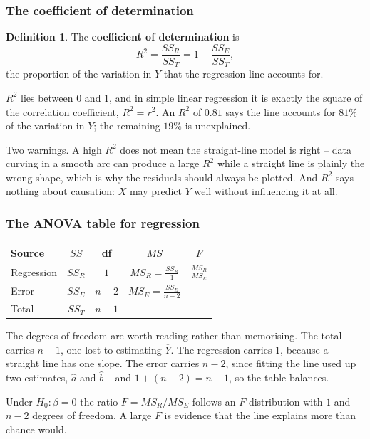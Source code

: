 \documentclass[11pt,a4paper]{article}
\theoremstyle{definition}
\newtheorem{definition}[thm]{Definition}
\begin{document}
\subsubsection{The coefficient of determination}

\begin{definition}
The \textbf{coefficient of determination} is
\[R^2=\frac{SS_R}{SS_T}=1-\frac{SS_E}{SS_T},\]
the proportion of the variation in $Y$ that the regression line accounts for.
\end{definition}

$R^2$ lies between 0 and 1, and in simple linear regression it is exactly the square of the
correlation coefficient, $R^2=r^2$. An $R^2$ of $0.81$ says the line accounts for $81\%$ of
the variation in $Y$; the remaining $19\%$ is unexplained.

Two warnings. A high $R^2$ does not mean the straight-line model is right -- data curving
in a smooth arc can produce a large $R^2$ while a straight line is plainly the wrong shape,
which is why the residuals should always be plotted. And $R^2$ says nothing about
causation: $X$ may predict $Y$ well without influencing it at all.

\subsubsection{The ANOVA table for regression}

\begin{table}[H]
\centering
\begin{tabular}{lcccc}
Source & $SS$ & df & $MS$ & $F$\\
\hline
Regression & $SS_R$ & $1$ & $MS_R=\frac{SS_R}{1}$ & $\frac{MS_R}{MS_E}$\\[6pt]
Error      & $SS_E$ & $n-2$ & $MS_E=\frac{SS_E}{n-2}$ & \\[4pt]
\hline
Total      & $SS_T$ & $n-1$ & & \\
\end{tabular}
\end{table}
The degrees of freedom are worth reading rather than memorising. The total carries $n-1$,
one lost to estimating $\overline{Y}$. The regression carries $1$, because a straight line
has one slope. The error carries $n-2$, since fitting the line used up two estimates,
$\hat{a}$ and $\hat{b}$ -- and $1+(n-2)=n-1$, so the table balances.

Under $H_0:\beta=0$ the ratio $F=MS_R/MS_E$ follows an $F$ distribution with $1$ and $n-2$
degrees of freedom. A large $F$ is evidence that the line explains more than chance would.
\end{document}
